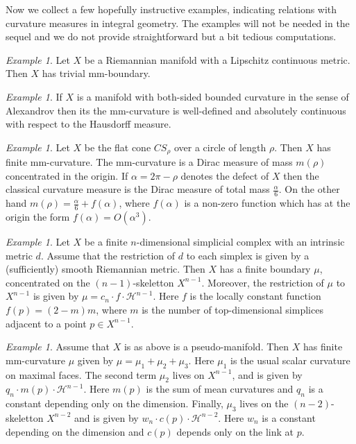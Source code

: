 \documentclass[12pt,leqno]{amsart}
\numberwithin{equation}{section}
\theoremstyle{definition}
\theoremstyle{remark}
\newtheorem{ex}[thm]{Example}
\begin{document}
Now we collect a few  hopefully instructive examples, indicating relations with curvature measures in integral geometry.  The examples  will not be needed in the sequel and we do not provide straightforward but a bit tedious computations.



 \begin{ex}
 Let $X$ be a Riemannian manifold with a Lipschitz continuous metric.
 Then $X$ has  trivial mm-boundary.
 \end{ex}


 \begin{ex}
  If $X$ is a manifold with  both-sided bounded curvature in the sense of Alexandrov then its
 the mm-curvature   is  well-defined and  absolutely continuous with respect to the Hausdorff measure.
 \end{ex}




\begin{ex}
 Let $X$ be the flat cone $CS_{\rho}$ over a circle of length $\rho$.
  Then $X$ has finite mm-curvature. The mm-curvature is a Dirac measure of mass $m(\rho)$ concentrated in the origin.
  If $\alpha =2\pi-\rho$ denotes the defect of $X$ then the classical curvature measure is the Dirac measure of total mass
  $\frac \alpha 6$.  On the other hand $m(\rho)= \frac \alpha 6 + f(\alpha)$, where
  $f(\alpha)$ is a non-zero function which has at the origin the form $f(\alpha)= O(\alpha ^3)$.
   \end{ex}




 \begin{ex}
 Let $X$ be a finite $n$-dimensional simplicial complex with an intrinsic metric $d$.
 Assume that the restriction of $d$ to each simplex is given by a (sufficiently) smooth Riemannian metric.
 Then $X$ has a finite boundary $\mu$, concentrated on  the $(n-1)$-skeletton $X^{n-1}$.  Moreover, the restriction of $\mu $ to
 $X^{n-1}$ is given by $\mu= c_n \cdot f \cdot \mathcal H ^{n-1}$.
 Here $f$ is the locally constant function $f(p)=(2-m)m$, where $m$ is the number of top-dimensional simplices
 adjacent to a point $p\in X^{n-1}$.
 \end{ex}


 \begin{ex}
 Assume that $X$ is as above  is a pseudo-manifold.
 Then $X$ has finite mm-curvature $\mu$ given by $\mu = \mu _1 + \mu _2 + \mu _3$.  Here $\mu_1$ is  the usual scalar
    curvature on maximal faces. The second term  $\mu _2$ lives on $ X^{n-1}$, and is given by
    $q_n \cdot m(p) \cdot \mathcal H^{n-1}$.
    Here $m(p)$ is the sum of mean curvatures and $q_n$ is a constant depending only on the dimension.
    Finally, $\mu_3$ lives on the $(n-2)$-skeletton  $X^{n-2}$ and is given by $w_n \cdot c(p) \cdot \mathcal H^{n-2}$.
     Here $w_n$ is a constant depending on the dimension and $c(p)$ depends only on the link at $p$.
 \end{ex}
\end{document}
